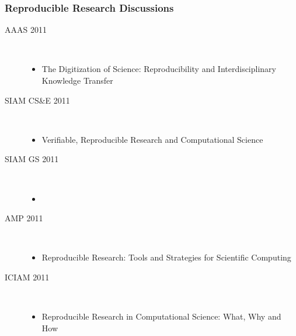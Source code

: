\begin{frame}
 \frametitle{Reproducible Research Discussions}

 \begin{description}
   \item[AAAS 2011] \
   \begin{itemize} \item The Digitization of Science: Reproducibility and Interdisciplinary Knowledge Transfer
   \end{itemize}
    \item[SIAM CS\&E 2011] \ 
    \begin{itemize}   
    \item Verifiable, Reproducible Research and Computational Science
    \end{itemize}
    \item[SIAM GS 2011] \
    \begin{itemize}   
    \item {\color{blue}{This minisymposium}} 
    \end{itemize}
    \item[AMP 2011] \
    \begin{itemize}   
    \item  Reproducible Research: Tools and Strategies for Scientific Computing
    \end{itemize}
    \item[ICIAM 2011] \
    \begin{itemize}
    \item Reproducible Research in Computational Science: What, Why and How
    \end{itemize}
    \end{description}
  \end{frame} 


